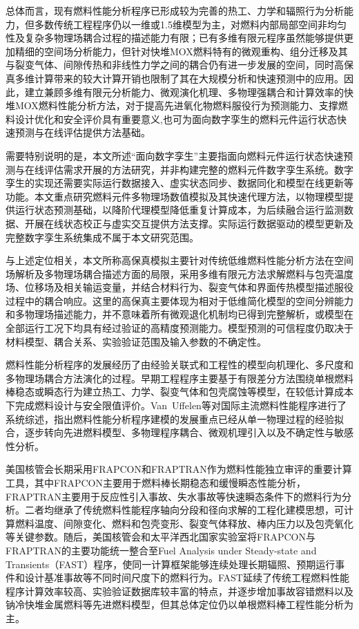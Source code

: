 总体而言，现有燃料性能分析程序已形成较为完善的热工、力学和辐照行为分析能力，但多数传统工程程序仍以一维或1.5维模型为主，对燃料内部局部空间非均匀性及复杂多物理场耦合过程的描述能力有限；已有多维有限元程序虽然能够提供更加精细的空间场分析能力，但针对快堆MOX燃料特有的微观重构、组分迁移及其与裂变气体、间隙传热和非线性力学之间的耦合仍有进一步发展的空间，同时高保真多维计算带来的较大计算开销也限制了其在大规模分析和快速预测中的应用。因此，建立兼顾多维有限元分析能力、微观演化机理、多物理强耦合和计算效率的快堆MOX燃料性能分析方法，对于提高先进氧化物燃料服役行为预测能力、支撑燃料设计优化和安全评价具有重要意义,也可为面向数字孪生的燃料元件运行状态快速预测与在线评估提供方法基础。

需要特别说明的是，本文所述“面向数字孪生”主要指面向燃料元件运行状态快速预测与在线评估需求开展的方法研究，并非构建完整的燃料元件数字孪生系统。数字孪生的实现还需要实际运行数据接入、虚实状态同步、数据同化和模型在线更新等功能。本文重点研究燃料元件多物理场数值模拟及其快速代理方法，以物理模型提供运行状态预测基础，以降阶代理模型降低重复计算成本，为后续融合运行监测数据、开展在线状态校正与虚实交互提供方法支撑。实际运行数据驱动的模型更新及完整数字孪生系统集成不属于本文研究范围。

与上述定位相关，本文所称高保真模拟主要针对传统低维燃料性能分析方法在空间场解析及多物理场耦合描述方面的局限，采用多维有限元方法求解燃料与包壳温度场、位移场及相关输运变量，并结合材料行为、裂变气体和界面传热模型描述服役过程中的耦合响应。这里的高保真主要体现为相对于低维简化模型的空间分辨能力和多物理场描述能力，并不意味着所有微观退化机制均已得到完整解析，或模型在全部运行工况下均具有经过验证的高精度预测能力。模型预测的可信程度仍取决于材料模型、耦合关系、实验验证范围及输入参数的不确定性。



燃料性能分析程序的发展经历了由经验关联式和工程性的模型向机理化、多尺度和多物理场耦合方法演化的过程。早期工程程序主要基于有限差分方法围绕单根燃料棒稳态或瞬态行为建立热工、力学、裂变气体和包壳腐蚀等模型，在较低计算成本下完成燃料设计与安全限值评价。Van~Uffelen等\cite{vanuffelenReviewFuelPerformance2019}对国际主流燃料性能程序进行了系统综述，指出燃料性能分析程序建模的发展重点已经从单一物理过程的经验拟合，逐步转向先进燃料模型、多物理程序耦合、微观机理引入以及不确定性与敏感性分析。

美国核管会长期采用FRAPCON和FRAPTRAN作为燃料性能独立审评的重要计算工具，其中FRAPCON主要用于燃料棒长期稳态和缓慢瞬态性能分析，FRAPTRAN主要用于反应性引入事故、失水事故等快速瞬态条件下的燃料行为分析。二者均继承了传统燃料性能程序轴向分段和径向求解的工程化建模思想，可计算燃料温度、间隙变化、燃料和包壳变形、裂变气体释放、棒内压力以及包壳氧化等关键参数。随后，美国核管会和太平洋西北国家实验室将FRAPCON与FRAPTRAN的主要功能统一整合至Fuel Analysis under Steady-state and Transients（FAST）程序，使同一计算框架能够连续处理长期辐照、预期运行事件和设计基准事故等不同时间尺度下的燃料行为\cite{porterFAST10Computer2020}。FAST延续了传统工程燃料性能程序计算效率较高、实验验证数据库较丰富的特点，并逐步增加事故容错燃料以及钠冷快堆金属燃料等先进燃料模型，但其总体定位仍以单根燃料棒工程性能分析为主。

